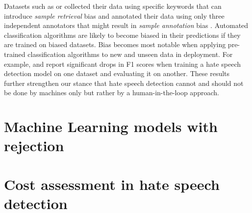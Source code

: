 %
Datasets such as \cite{waseem2016hateful} or \cite{basile2019semeval} collected their data using specific keywords that can introduce \textit{sample retrieval} bias and annotated their data using only three independent annotators that might result in \textit{sample annotation} bias \cite{balayn2021automatic}.
%
Automated classification algorithms are likely to become biased in their predictions if they are trained on biased datasets.
%
Bias becomes most notable when applying pre-trained classification algorithms to new and unseen data in deployment.
%
For example, \citet{grondahl2018all} and \citet{arango2019hate} report significant drops in F1 scores when training a hate speech detection model on one dataset and evaluating it on another.
%
These results further strengthen our stance that hate speech detection cannot and should not be done by machines only but rather by a human-in-the-loop approach.


\section{Machine Learning models with rejection}


\section{Cost assessment in hate speech detection}

